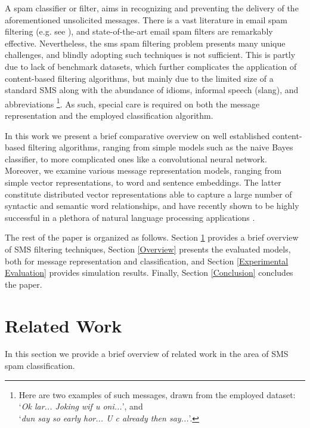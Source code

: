 \documentclass[letterpaper]{article}
\begin{document}
A spam classifier or filter, aims in recognizing and preventing the delivery of the aforementioned unsolicited messages. There is a vast literature in email spam filtering (e.g. see \cite{cormack2008email} \cite{blanzieri2008survey}), and state-of-the-art email spam filters are remarkably effective. Nevertheless, the sms spam filtering problem presents many unique challenges, and blindly adopting such techniques is not sufficient. This is partly due to lack of benchmark datasets, which further complicates the application of content-based filtering algorithms, but mainly due to the limited size of a standard SMS along with the abundance of idioms, informal speech (slang), and abbreviations \footnote{Here are two examples of such messages, drawn from the employed dataset: `\emph{Ok lar... Joking wif u oni...}', and \\ `\emph{dun say so early hor... U c already then say...}'.}. As such, special care is required on both the message representation and the employed classification algorithm.

In this work we present a brief comparative overview on well established content-based filtering algorithms, ranging from simple models such as the naive Bayes classifier, to more complicated ones like a convolutional neural network. Moreover, we examine various message representation models, ranging from simple vector representations, to word and sentence embeddings. The latter constitute distributed vector representations able to capture a large number of syntactic and semantic word relationships, and have recently shown to be highly successful in a plethora of natural language processing applications \cite{mikolov2013distributed} \cite{bojanowski2016enriching} \cite{pagliardini2017unsupervised}.

The rest of the paper is organized as follows. Section \ref{Related Work} provides a brief overview of SMS filtering techniques, Section \ref{Overview} presents the evaluated models, both for message representation and classification, and Section \ref{Experimental Evaluation} provides simulation results. Finally, Section \ref{Conclusion} concludes the paper.

\section{Related Work} \label{Related Work}

In this section we provide a brief overview of related work in the area of SMS spam classification.
\end{document}
